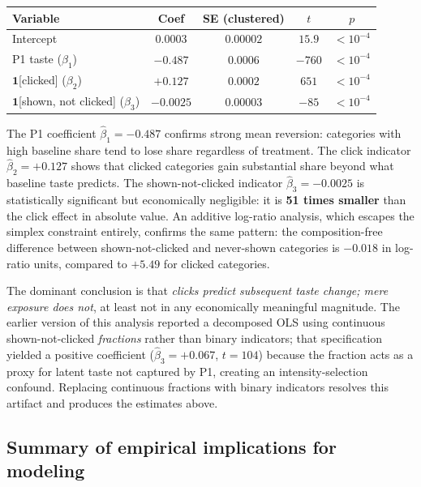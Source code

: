 \documentclass[11pt]{article}
\begin{document}
\begin{center}
\begin{tabular}{lcccc}
\toprule
Variable & Coef & SE (clustered) & $t$ & $p$ \\
\midrule
Intercept & $0.0003$ & $0.00002$ & $15.9$ & $< 10^{-4}$ \\
P1 taste ($\beta_1$) & $-0.487$ & $0.0006$ & $-760$ & $< 10^{-4}$ \\
$\mathbf{1}$[clicked] ($\beta_2$) & $+0.127$ & $0.0002$ & $651$ & $< 10^{-4}$ \\
$\mathbf{1}$[shown, not clicked] ($\beta_3$) & $-0.0025$ & $0.00003$ & $-85$ & $< 10^{-4}$ \\
\bottomrule
\end{tabular}
\end{center}

The P1 coefficient $\hat{\beta}_1 = -0.487$ confirms strong mean reversion: categories with high baseline share tend to lose share regardless of treatment. The click indicator $\hat{\beta}_2 = +0.127$ shows that clicked categories gain substantial share beyond what baseline taste predicts. The shown-not-clicked indicator $\hat{\beta}_3 = -0.0025$ is statistically significant but economically negligible: it is \textbf{51 times smaller} than the click effect in absolute value. An additive log-ratio analysis, which escapes the simplex constraint entirely, confirms the same pattern: the composition-free difference between shown-not-clicked and never-shown categories is $-0.018$ in log-ratio units, compared to $+5.49$ for clicked categories.

The dominant conclusion is that \emph{clicks predict subsequent taste change; mere exposure does not}, at least not in any economically meaningful magnitude. The earlier version of this analysis reported a decomposed OLS using continuous shown-not-clicked \emph{fractions} rather than binary indicators; that specification yielded a positive coefficient ($\hat{\beta}_3 = +0.067$, $t = 104$) because the fraction acts as a proxy for latent taste not captured by P1, creating an intensity-selection confound. Replacing continuous fractions with binary indicators resolves this artifact and produces the estimates above.

\subsection{Summary of empirical implications for modeling}
\end{document}
